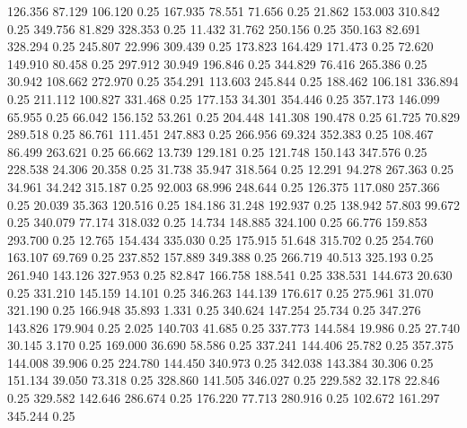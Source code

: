  126.356   87.129  106.120         0.25
 167.935   78.551   71.656         0.25
  21.862  153.003  310.842         0.25
 349.756   81.829  328.353         0.25
  11.432   31.762  250.156         0.25
 350.163   82.691  328.294         0.25
 245.807   22.996  309.439         0.25
 173.823  164.429  171.473         0.25
  72.620  149.910   80.458         0.25
 297.912   30.949  196.846         0.25
 344.829   76.416  265.386         0.25
  30.942  108.662  272.970         0.25
 354.291  113.603  245.844         0.25
 188.462  106.181  336.894         0.25
 211.112  100.827  331.468         0.25
 177.153   34.301  354.446         0.25
 357.173  146.099   65.955         0.25
  66.042  156.152   53.261         0.25
 204.448  141.308  190.478         0.25
  61.725   70.829  289.518         0.25
  86.761  111.451  247.883         0.25
 266.956   69.324  352.383         0.25
 108.467   86.499  263.621         0.25
  66.662   13.739  129.181         0.25
 121.748  150.143  347.576         0.25
 228.538   24.306   20.358         0.25
  31.738   35.947  318.564         0.25
  12.291   94.278  267.363         0.25
  34.961   34.242  315.187         0.25
  92.003   68.996  248.644         0.25
 126.375  117.080  257.366         0.25
  20.039   35.363  120.516         0.25
 184.186   31.248  192.937         0.25
 138.942   57.803   99.672         0.25
 340.079   77.174  318.032         0.25
  14.734  148.885  324.100         0.25
  66.776  159.853  293.700         0.25
  12.765  154.434  335.030         0.25
 175.915   51.648  315.702         0.25
 254.760  163.107   69.769         0.25
 237.852  157.889  349.388         0.25
 266.719   40.513  325.193         0.25
 261.940  143.126  327.953         0.25
  82.847  166.758  188.541         0.25
 338.531  144.673   20.630         0.25
 331.210  145.159   14.101         0.25
 346.263  144.139  176.617         0.25
 275.961   31.070  321.190         0.25
 166.948   35.893    1.331         0.25
 340.624  147.254   25.734         0.25
 347.276  143.826  179.904         0.25
   2.025  140.703   41.685         0.25
 337.773  144.584   19.986         0.25
  27.740   30.145    3.170         0.25
 169.000   36.690   58.586         0.25
 337.241  144.406   25.782         0.25
 357.375  144.008   39.906         0.25
 224.780  144.450  340.973         0.25
 342.038  143.384   30.306         0.25
 151.134   39.050   73.318         0.25
 328.860  141.505  346.027         0.25
 229.582   32.178   22.846         0.25
 329.582  142.646  286.674         0.25
 176.220   77.713  280.916         0.25
 102.672  161.297  345.244         0.25
